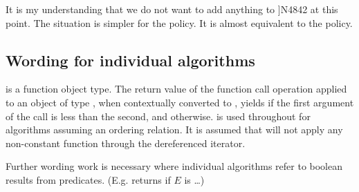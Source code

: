 \newcommand\tmp{[algorithms.parallel.exceptions]}
It is my understanding that we do not want to add anything to \citep[§25.3.4 \tmp{}]{N4842} at this point.
The situation is simpler for the \simdEP policy.
It is almost equivalent to the  policy.

\subsection{Wording for individual algorithms}
\begin{wgText}
  \setcounter{Paras}{1}%
    \pnum
     is a function object type.
    The return value of the function call operation applied to an object of type , when contextually converted to \bool, yields \true if the first argument of the call is less than the second, and \false otherwise.
     is used throughout for algorithms assuming an ordering relation.
    It is assumed that  will not apply any non-constant function through the dereferenced iterator.

\end{wgText}

Further wording work is necessary where individual algorithms refer to boolean results from predicates. (E.g.  returns  if $E$\code{)} is \false\ldots)

